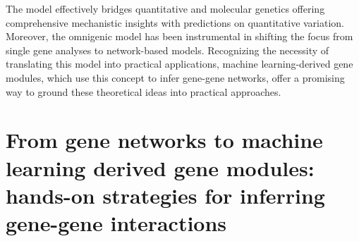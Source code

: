 The model effectively bridges quantitative and molecular genetics offering comprehensive mechanistic insights with predictions on quantitative variation.
Moreover, the omnigenic model has been instrumental in shifting the focus from single gene analyses to network-based models.
Recognizing the necessity of translating this model into practical applications, machine learning-derived gene modules, which use this concept to infer gene-gene networks, offer a promising way to ground these theoretical ideas into practical approaches.

\hypertarget{from-gene-networks-to-machine-learning-derived-gene-modules-hands-on-strategies-for-inferring-gene-gene-interactions}{%
\section{From gene networks to machine learning derived gene modules: hands-on strategies for inferring gene-gene interactions}\label{from-gene-networks-to-machine-learning-derived-gene-modules-hands-on-strategies-for-inferring-gene-gene-interactions}}

